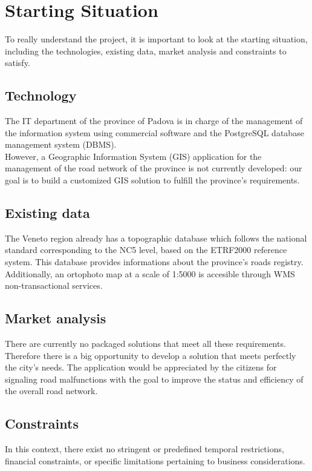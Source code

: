 \section{Starting Situation}
To really understand the project, it is important to look at the starting situation, including the technologies, existing data, market analysis and constraints to satisfy.
\subsection{Technology}
The IT department of the province of Padova is in charge of the management of the information system using commercial software and the PostgreSQL database management system (DBMS).\\
However, a Geographic Information System (GIS) application for the management of the road network of the province is not currently developed: our goal is to build a customized GIS solution to fulfill the province’s requirements.
\subsection{Existing data}
The Veneto region already has a topographic database which follows the national standard corresponding to the NC5 level, based on the ETRF2000 reference system. This database provides informations about the province's roads registry.\\
Additionally, an ortophoto map at a scale of 1:5000 is accesible through WMS non-transactional services.
\subsection{Market analysis}
There are currently no packaged solutions that meet all these requirements. Therefore there is a big opportunity to develop a solution that meets perfectly the city's needs. 
The application would be appreciated by the citizens for  signaling road malfunctions with the goal to improve the status and efficiency of the overall road network.
\subsection{Constraints}
In this context, there exist no stringent or predefined temporal restrictions, financial constraints, or specific limitations pertaining to business considerations.